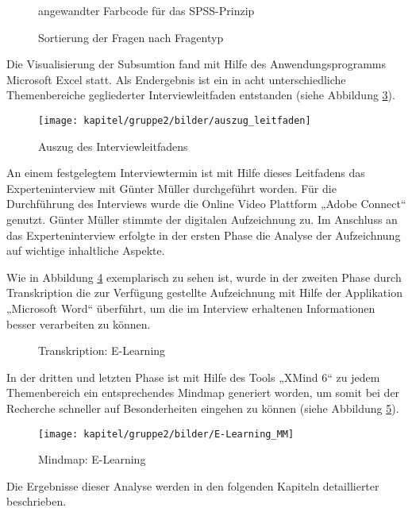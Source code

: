 \begin{figure}[h!]
	\centering
	\caption{angewandter Farbcode für das SPSS-Prinzip}
	\label{fig_farbcode_SPSS}
\end{figure}

\begin{figure}[h!]
	\centering
	\caption{Sortierung der Fragen nach Fragentyp}
	\label{fig_sortierung_fragentyp}
\end{figure}

Die Visualisierung der Subsumtion fand mit Hilfe des Anwendungsprogramms Microsoft Excel statt. Als Endergebnis ist ein in acht unterschiedliche Themenbereiche gegliederter Interviewleitfaden entstanden (siehe Abbildung \ref{fig_auszug_interviewleitfaden}).

\begin{figure}[h!]
	\centering
	\texttt{[image: kapitel/gruppe2/bilder/auszug\_leitfaden]}
	\caption{Auszug des Interviewleitfadens}
	\label{fig_auszug_interviewleitfaden}
\end{figure}

An einem festgelegtem Interviewtermin ist mit Hilfe dieses Leitfadens das Experteninterview mit Günter Müller durchgeführt worden. Für die Durchführung des Interviews wurde die Online Video Plattform „Adobe Connect“ genutzt. Günter Müller stimmte der digitalen Aufzeichnung zu. Im Anschluss an das Experteninterview erfolgte in der ersten Phase die Analyse der Aufzeichnung auf wichtige inhaltliche Aspekte.

Wie in Abbildung \ref{fig_E-Learning_Transkription} exemplarisch zu sehen ist, wurde in der zweiten Phase durch Transkription die zur Verfügung gestellte Aufzeichnung mit Hilfe der Applikation „Microsoft Word“ überführt, um die im Interview erhaltenen Informationen besser verarbeiten zu können.

\begin{figure}[h!]
	\centering
	\caption{Transkription: E-Learning}
	\label{fig_E-Learning_Transkription}
\end{figure}

In der dritten und letzten Phase ist mit Hilfe des Tools „XMind 6“ zu jedem Themenbereich ein entsprechendes Mindmap generiert worden, um somit bei der Recherche schneller auf Besonderheiten eingehen zu können  (siehe Abbildung \ref{fig_E-Learning_MM}).

\begin{figure}[h!]
	\centering
	\texttt{[image: kapitel/gruppe2/bilder/E-Learning\_MM]}
	\caption{Mindmap: E-Learning}
	\label{fig_E-Learning_MM}
\end{figure}

Die Ergebnisse dieser Analyse werden in den folgenden Kapiteln detaillierter beschrieben. 